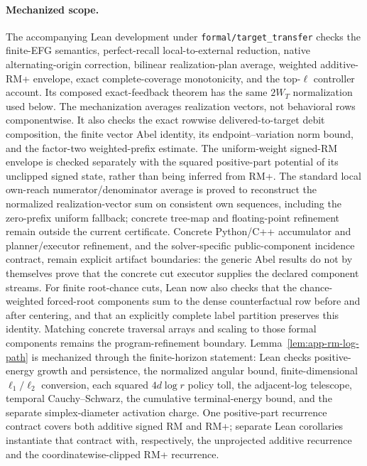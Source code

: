 \paragraph{Mechanized scope.}
The accompanying Lean development under \texttt{formal/target\_transfer}
checks the finite-EFG semantics, perfect-recall local-to-external reduction,
native alternating-origin correction, bilinear realization-plan average,
weighted additive-RM+ envelope, exact complete-coverage monotonicity, and the
top-$\ell$ controller account. Its composed exact-feedback theorem has the
same $2W_T$ normalization used below. The mechanization averages realization
vectors, not behavioral rows componentwise. It also checks the exact rowwise
delivered-to-target debit composition, the finite vector Abel identity, its
endpoint--variation norm bound, and the factor-two weighted-prefix estimate.
The uniform-weight signed-RM envelope is checked separately with the squared
positive-part potential of its unclipped signed state, rather than being
inferred from RM+. The standard local own-reach numerator/denominator average
is proved to reconstruct the normalized realization-vector sum on consistent
own sequences, including the zero-prefix uniform fallback; concrete tree-map
and floating-point refinement remain outside the current certificate.
Concrete Python/C++ accumulator and planner/executor refinement, and the
solver-specific public-component incidence contract, remain explicit artifact
boundaries: the generic Abel results do not by themselves prove that the
concrete cut executor supplies the declared component streams.
For finite root-chance cuts, Lean now also checks that the chance-weighted
forced-root components sum to the dense counterfactual row before and after
centering, and that an explicitly complete label partition preserves this
identity. Matching concrete traversal arrays and scaling to those formal
components remains the program-refinement boundary.
Lemma~\ref{lem:app-rm-log-path} is mechanized through the finite-horizon
statement: Lean checks positive-energy growth and persistence, the normalized
angular bound, finite-dimensional $\ell_1/\ell_2$ conversion, each squared
$4d\log r$ policy toll, the adjacent-log telescope, temporal
Cauchy--Schwarz, the cumulative terminal-energy bound, and the separate
simplex-diameter activation charge.  One positive-part recurrence contract
covers both additive signed RM and RM+; separate Lean corollaries instantiate
that contract with, respectively, the unprojected additive recurrence and the
coordinatewise-clipped RM+ recurrence.

